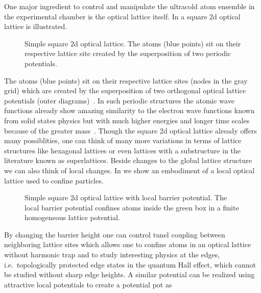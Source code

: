 One major ingredient to control and manipulate the ultracold atom ensemble in
the experimental chamber is the optical lattice itself. In
 a square \gls{2d} optical lattice is illustrated.
\begin{figure}[htb]
  \centering
  \begin{adjustbox}{width=\textwidth}
    
  \end{adjustbox}
  \caption{Simple square \gls{2d} optical lattice. The atoms (blue points) sit
    on their respective lattice site created by the superposition of two
    periodic potentials.
  }\label{fig:optical_lattice}
\end{figure}
The atoms (blue points) sit on their respective lattice sites (nodes in the
gray grid) which are created by the superposition of two orthogonal optical
lattice potentials (outer diagrams)~\cite{Grimm2000}. In such periodic
structures the atomic wave functions already show amazing similarity to the
electron wave functions known from solid states physics but with much higher
energies and longer time scales because of the greater
mass~\cite{Fisher1989,Jaksch1998}. Though the square \gls{2d} optical lattice
already offers many possiblities, one can think of many more variations in
terms of lattice structures like hexagonal lattices or even lattices with a
substructure in the literature known as superlattices. Beside changes to the
global lattice structure we can also think of local changes. In
 we show an embodiment of a local
optical lattice used to confine particles.
\begin{figure}[htb]
  \centering
  \begin{adjustbox}{width=\textwidth}
    
  \end{adjustbox}
  \caption{Simple square \gls{2d} optical lattice with local barrier
    potential. The local barrier potential confines atoms inside the green box
    in a finite homogeneous lattice potential.
  }\label{fig:optical_lattice_local_barrier}
\end{figure}
By changing the barrier height one can control tunel coupling between
neighboring lattice sites which allows one to confine atoms in an optical
lattice without harmonic trap and to study interesting physics at the edges,
i.e.\ topologically protected edge states in the quantum Hall effect, which
cannot be studied without sharp edge heights. A similar potential can be
realized using attractive local potentials to create a potential pot as
